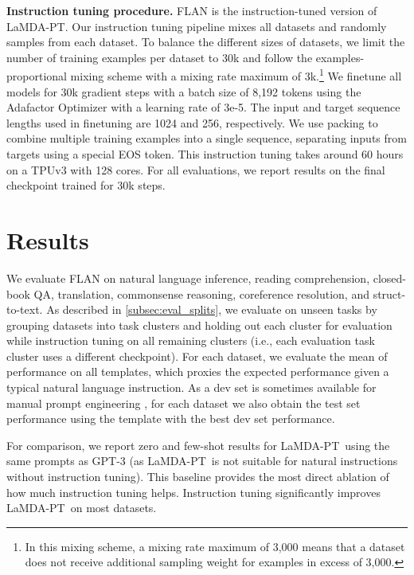 \textbf{Instruction tuning procedure.} FLAN is the instruction-tuned version of LaMDA-PT. Our instruction tuning pipeline mixes all datasets and randomly samples from each dataset. To balance the different sizes of datasets, we limit the number of training examples per dataset to 30k and follow the examples-proportional mixing scheme \citep{raffel2019exploring} with a mixing rate maximum of 3k.\footnote{In this mixing scheme, a mixing rate maximum of 3,000 means that a dataset does not receive additional sampling weight for examples in excess of 3,000.} We finetune all models for 30k gradient steps with a batch size of 8,192 tokens using the Adafactor Optimizer \citep{shazeer2018adafactor} with a learning rate of 3e-5. The input and target sequence lengths used in finetuning are 1024 and 256, respectively. We use packing \citep{raffel2019exploring} to combine multiple training examples into a single sequence, separating inputs from targets using a special EOS token. This instruction tuning takes around 60 hours on a TPUv3 with 128 cores. For all evaluations, we report results on the final checkpoint trained for 30k steps.

\section{Results}\label{sec:results}

We evaluate FLAN on natural language inference, reading comprehension, closed-book QA, translation, commonsense reasoning, coreference resolution, and struct-to-text. As described in \ref{subsec:eval_splits}, we evaluate on unseen tasks by grouping datasets into task clusters and holding out each cluster for evaluation while instruction tuning on all remaining clusters (i.e., each evaluation task cluster uses a different checkpoint). For each dataset, we evaluate the mean of performance on all templates, which proxies the expected performance given a typical natural language instruction. As a dev set is sometimes available for manual prompt engineering \citep{brown2020language}, for each dataset we also obtain the test set performance using the template with the best dev set performance.

For comparison, we report zero and few-shot results for LaMDA-PT\ using the same prompts as GPT-3 (as LaMDA-PT\ is not suitable for natural instructions without instruction tuning). This baseline provides the most direct ablation of how much instruction tuning helps. Instruction tuning significantly improves LaMDA-PT\ on most datasets.

